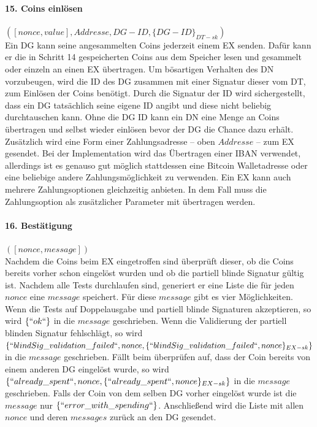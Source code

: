 \documentclass[
	fontsize=11pt,
	headings=small,
	parskip=half,           %
	bibliography=totoc,
	numbers=noenddot,       %
	open=any,               %
]{scrreprt}
\begin{document}
\paragraph{15. Coins einlösen} $([nonce,value], Addresse, DG-ID, \{DG-ID\}_{DT-sk})$\\
Ein DG kann seine angesammelten Coins jederzeit einem EX senden. Dafür kann er die in Schritt 14 gespeicherten Coins aus dem Speicher lesen und gesammelt oder einzeln an einen EX übertragen. Um bösartigen Verhalten des DN vorzubeugen, wird die ID des DG zusammen mit einer Signatur dieser vom DT, zum Einlösen der Coins benötigt. Durch die Signatur der ID wird sichergestellt, dass ein DG tatsächlich seine eigene ID angibt und diese nicht beliebig durchtauschen kann. Ohne die DG ID kann ein DN eine Menge an Coins übertragen und selbst wieder einlösen bevor der DG die Chance dazu erhält. Zusätzlich wird eine Form einer Zahlungsadresse -- oben $Addresse$ -- zum EX gesendet. Bei der Implementation wird das Übertragen einer IBAN verwendet, allerdings ist es genauso gut möglich stattdessen eine Bitcoin Walletadresse oder eine beliebige andere Zahlungsmöglichkeit zu verwenden. Ein EX kann auch mehrere Zahlungsoptionen gleichzeitig anbieten. In dem Fall muss die Zahlungsoption als zusätzlicher Parameter mit übertragen werden.

\paragraph{16. Bestätigung} $([nonce, message])$\\
Nachdem die Coins beim EX eingetroffen sind überprüft dieser, ob die Coins bereits vorher schon eingelöst wurden und ob die partiell blinde Signatur gültig ist. Nachdem alle Tests durchlaufen sind, generiert er eine Liste die für jeden $nonce$ eine $message$ speichert. Für diese $message$ gibt es vier Möglichkeiten. Wenn die Tests auf Doppelausgabe und partiell blinde Signaturen akzeptieren, so wird $\{``ok``\}$ in die $message$ geschrieben. Wenn die Validierung der partiell blinden Signatur fehlschlägt, so wird $\{``blindSig\_validation\_failed``, nonce, \{``blindSig\_validation\_failed``, nonce\}_{EX-sk}\}$ in die $message$ geschrieben. Fällt beim überprüfen auf, dass der Coin bereits von einem anderen DG eingelöst wurde, so wird $\{``already\_spent``, nonce, \{``already\_spent``, nonce\}_{EX-sk}\}$ in die $message$ geschrieben. Falls der Coin von dem selben DG vorher eingelöst wurde ist die $message$ nur $\{``error\_with\_spending``\}$. Anschließend wird die Liste mit allen $nonce$ und deren $messages$ zurück an den DG gesendet.
\end{document}
